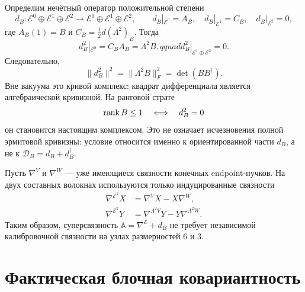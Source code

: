 Определим нечётный оператор положительной степени
\begin{equation}
 d_B:\mathcal E^0\oplus\mathcal E^1\oplus\mathcal E^2
 \longrightarrow
 \mathcal E^0\oplus\mathcal E^1\oplus\mathcal E^2,
 \qquad
 d_B|_{\mathcal E^0}=A_B,\quad
 d_B|_{\mathcal E^1}=C_B,\quad
 d_B|_{\mathcal E^2}=0,
 \label{eq:v7-field-superconnection-oriented-differential}
\end{equation}
где $A_B(1)=B$ и $C_B=\frac12d(\Lambda^2)_B$. Тогда
\begin{equation}
 d_B^2|_{\mathcal E^0}=C_BA_B=\Lambda^2B,qquad
 d_B^2|_{\mathcal E^1\oplus\mathcal E^2}=0.
 \label{eq:v7-field-superconnection-curvature}
\end{equation}
Следовательно,
\begin{equation}
 \|d_B^2\|^2=\|\Lambda^2B\|_F^2
 =\det(BB^\dagger).
 \label{eq:v7-field-superconnection-curvature-norm}
\end{equation}
Вне вакуума это кривой комплекс: квадрат дифференциала является
алгебраической кривизной. На ранговой страте
\begin{equation}
 \operatorname{rank} B\leq1
 \quad\Longleftrightarrow\quad
 d_B^2=0
 \label{eq:v7-field-superconnection-integrable-locus}
\end{equation}
он становится настоящим комплексом. Это не означает исчезновения полной
эрмитовой кривизны: условие относится именно к ориентированной части
$d_B$, а не к $\mathcal D_B=d_B+d_B^\dagger$.

Пусть $\nabla^V$ и $\nabla^W$ --- уже имеющиеся связности конечных
endpoint-пучков. На двух составных волокнах используются только
индуцированные связности
\begin{align}
 \nabla^{\mathcal E^1}X
 &=\nabla^V X-X\nabla^W,\\
 \nabla^{\mathcal E^2}Y
 &=\nabla^{\Lambda^2V}Y-Y\nabla^{\Lambda^2W}.
 \label{eq:v7-field-superconnection-induced-connections}
\end{align}
Таким образом, суперсвязность $\mathbb A=\nabla^{\mathcal E}+d_B$ не
требует независимой калибровочной связности на узлах размерностей $6$ и
$3$.

\section{Фактическая блочная ковариантность}

